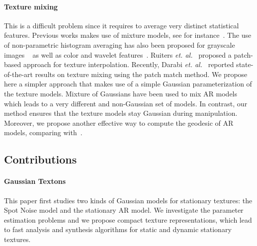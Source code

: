 \paragraph{Texture mixing}
This is a difficult problem since it requires to average very distinct statistical features. Previous works makes use of mixture models, see for instance~\cite{bar-joseph-texture-mixing}. The use of non-parametric histogram averaging has also been proposed for grayscale images ~\cite{matusik-mixing} as well as color and wavelet features~\cite{rabin-textures}. Ruiters \emph{et. al.}~\cite{ruiters-2010-interpolation} proposed a patch-based approach for texture interpolation. Recently, Darabi \emph{et. al.}~\cite{ImageMelding12} reported state-of-the-art results on texture mixing using the patch match method. We propose here a simpler approach that makes use of a simple Gaussian parameterization of the texture models.  Mixture of Gaussians have been used to mix AR models~\cite{ar-mixing} which leads to a very different and non-Gaussian set of models. In contrast, our method ensures that the texture models stay Gaussian during manipulation. Moreover, we propose another effective way to compute the geodesic of AR models, comparing with~\cite{ravishanker-arfima,ravishanker-arma,garderen-ar}.


\subsection{Contributions}
\label{sec-contrib}
\paragraph{Gaussian Textons}
This paper first studies two kinds of Gaussian models for stationary textures: the Spot Noise model and the stationary AR model. We investigate the parameter estimation problems and we propose compact texture representations, which lead to fast analysis and synthesis algorithms for static and dynamic stationary textures.

